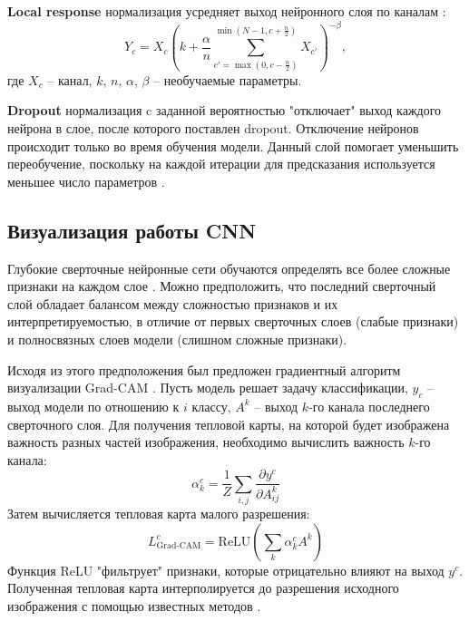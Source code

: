 \textbf{Local response} нормализация усредняет выход нейронного слоя по каналам \cite{alexnet}:
\begin{equation}
    Y_{c} = X_{c} \left( k + \frac{\alpha}{n}\sum_{c' = \max(0, c - \frac{n}{2})}^{\min(N - 1, c + \frac{n}{2})} X_{c'} \right)^{-\beta},
\end{equation}
где $X_c$ -- канал, $k$, $n$, $\alpha$, $\beta$ -- необучаемые параметры.

\textbf{Dropout} нормализация c заданной вероятностью "отключает" выход каждого нейрона в слое, после которого поставлен dropout.
Отключение нейронов происходит только во время обучения модели.
Данный слой помогает уменьшить переобучение, поскольку на каждой итерации для предсказания используется меньшее число параметров \cite{dropout}.

\subsection{Визуализация работы CNN}

Глубокие сверточные нейронные сети обучаются определять все более сложные признаки на каждом слое \cite{dlbook}.
Можно предположить, что последний сверточный слой обладает балансом между сложностью признаков и их интерпретируемостью, в отличие от первых сверточных слоев (слабые признаки) и полносвязных слоев модели (слишном сложные признаки).

Исходя из этого предположения был предложен градиентный алгоритм визуализации Grad-CAM \cite{gradcam}.
Пусть модель решает задачу классификации, $y_c$ -- выход модели по отношению к $i$ классу, $A^k$ -- выход $k$-го канала последнего сверточного слоя.
Для получения тепловой карты, на которой будет изображена важность разных частей изображения, необходимо вычислить важность $k$-го канала:
\begin{equation}
    \alpha_k^c = \frac{1}{Z} \sum_{i, j} \frac{\partial y^c}{\partial A_{ij}^k}
\end{equation}
Затем вычисляется тепловая карта малого разрешения:
\begin{equation}
    L_{\text{Grad-CAM}}^c = \text{ReLU}(\sum_k \alpha_k^c A^k)
\end{equation}
Функция ReLU "фильтрует" признаки, которые отрицательно влияют на выход $y^c$.
Полученная тепловая карта интерполируется до разрешения исходного изображения с помощью известных методов \cite{gradcam}.